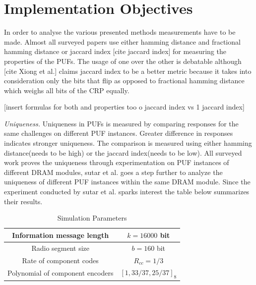 \documentclass[journal, a4paper]{IEEEtran}
\begin{document}
\section{Implementation Objectives}
In order to analyse the various presented methods measurements have to be made. Almost all surveyed papers use either hamming distance and fractional hamming distance or jaccard index [cite jaccard index] for measuring the properties of the PUFs. The usage of one over the other is debatable although [cite Xiong et al.] claims jaccard index to be a better metric because it takes into consideration only the bits that flip as opposed to fractional hamming distance which weighs all bits of the CRP equally. 

[insert formulas for both and properties too o jaccard index vs 1 jaccard index]

\textit{Uniqueness.} Uniqueness in PUFs is measured by comparing responses for the same challenges on different PUF instances. Greater difference in responses indicates stronger uniqueness.  The comparison is measured using either hamming distance(needs to be high) or the jaccard index(needs to be low). All surveyed work proves the uniqueness through experimentation on PUF instances of different DRAM modules, sutar et al. goes a step further to analyze the uniqueness of different PUF instances within the same DRAM module. Since the experiment conducted by sutar et al. sparks interest the table below summarizes their results.

\begin{table}[!hbt]
    \begin{center}
    \caption{Simulation Parameters}
    \label{tab:simParameters}
    \begin{tabular}{|c|c|}
        \hline
        Information message length & $k=16000$ bit \\
        \hline
        Radio segment size & $b=160$ bit \\
        \hline
        Rate of component codes & $R_{cc}=1/3$\\
        \hline
        Polynomial of component encoders & $[1 , 33/37 , 25/37]_8$\\
        \hline
    \end{tabular}
    \end{center}
\end{table}
\end{document}
